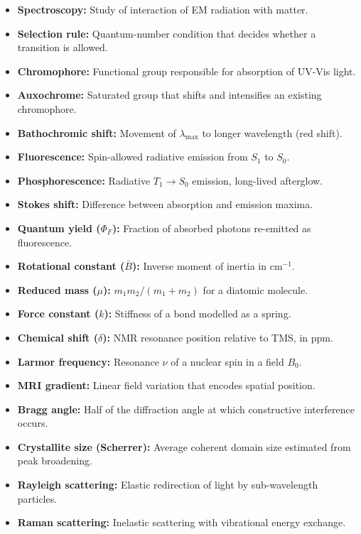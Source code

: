 \documentclass[12pt,a4paper]{article}
\begin{document}
\begin{tcolorbox}[defbox, title={One-Line Definitions}]
\begin{itemize}[leftmargin=*, itemsep=2pt, topsep=2pt]
  \item \textbf{Spectroscopy:} Study of interaction of EM radiation with matter.
  \item \textbf{Selection rule:} Quantum-number condition that decides whether a transition is allowed.
  \item \textbf{Chromophore:} Functional group responsible for absorption of UV-Vis light.
  \item \textbf{Auxochrome:} Saturated group that shifts and intensifies an existing chromophore.
  \item \textbf{Bathochromic shift:} Movement of $\lambda_{\max}$ to longer wavelength (red shift).
  \item \textbf{Fluorescence:} Spin-allowed radiative emission from $S_1$ to $S_0$.
  \item \textbf{Phosphorescence:} Radiative $T_1\to S_0$ emission, long-lived afterglow.
  \item \textbf{Stokes shift:} Difference between absorption and emission maxima.
  \item \textbf{Quantum yield ($\Phi_F$):} Fraction of absorbed photons re-emitted as fluorescence.
  \item \textbf{Rotational constant ($\bar{B}$):} Inverse moment of inertia in $\mathrm{cm^{-1}}$.
  \item \textbf{Reduced mass ($\mu$):} $m_1 m_2/(m_1+m_2)$ for a diatomic molecule.
  \item \textbf{Force constant ($k$):} Stiffness of a bond modelled as a spring.
  \item \textbf{Chemical shift ($\delta$):} NMR resonance position relative to TMS, in ppm.
  \item \textbf{Larmor frequency:} Resonance $\nu$ of a nuclear spin in a field $B_0$.
  \item \textbf{MRI gradient:} Linear field variation that encodes spatial position.
  \item \textbf{Bragg angle:} Half of the diffraction angle at which constructive interference occurs.
  \item \textbf{Crystallite size (Scherrer):} Average coherent domain size estimated from peak broadening.
  \item \textbf{Rayleigh scattering:} Elastic redirection of light by sub-wavelength particles.
  \item \textbf{Raman scattering:} Inelastic scattering with vibrational energy exchange.

\end{itemize}
\end{tcolorbox}
\end{document}
